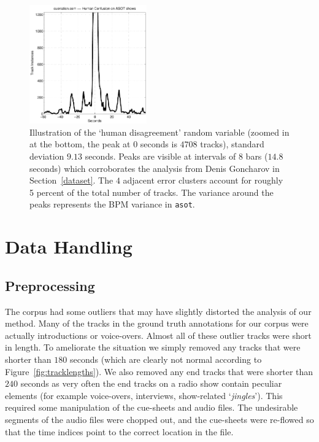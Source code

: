 \documentclass[twocolumn]{article}
\begin{document}
	\begin{figure}
		\centering
		\includegraphics[width=0.45\textwidth]{images/human_confusion}
		
		\caption{Illustration of the `human disagreement' random variable (zoomed in at the bottom, the peak at $0$ seconds is $4708$ tracks), standard deviation $9.13$ seconds. Peaks are visible at intervals of $8$ bars ($14.8$ seconds) which corroborates the analysis from Denis Goncharov in Section~\ref{dataset}. The $4$ adjacent error clusters account for roughly 5 percent of the total number of tracks. The variance around the peaks represents the BPM variance in \texttt{asot}. }
		\label{fig:human_muchconfuse}
	\end{figure} 
	
	\section{Data Handling}\label{sec:data-handling}
	
	\subsection{Preprocessing}\label{proprocessing} %
	
	The corpus had some outliers that may have slightly distorted the analysis of our method. Many of the tracks in the ground truth annotations for our corpus were actually introductions or voice-overs. Almost all of these outlier tracks were short in length. To ameliorate the situation we simply removed any tracks that were shorter than $180$ seconds (which are clearly not normal according to Figure~\ref{fig:tracklengths}). We also removed any end tracks that were shorter than $240$ seconds as very often the end tracks on a radio show contain peculiar elements (for example voice-overs, interviews, show-related `\textit{jingles}'). This required some manipulation of the cue-sheets and audio files. The undesirable segments of the audio files were chopped out, and the cue-sheets were re-flowed so that the time indices point to the correct location in the file. 
	
\end{document}
